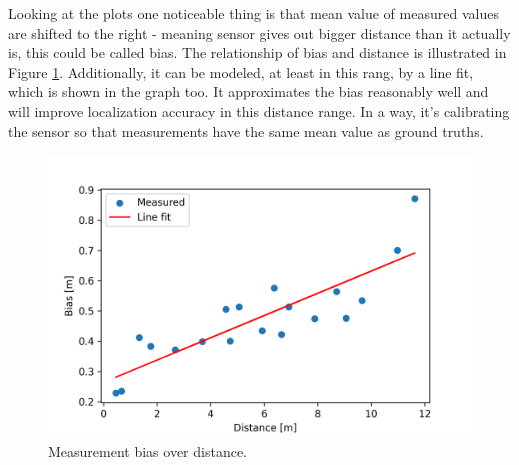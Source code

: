 Looking at the plots one noticeable thing is that mean value of measured values are shifted to the right - meaning sensor gives out bigger distance than it actually is, this could be called bias. The relationship of bias and distance is illustrated in Figure \ref{fig:distance_bias}. Additionally, it can be modeled, at least in this rang,  by a line fit, which is shown in the graph too. It approximates the bias reasonably well and will improve localization accuracy in this distance range. In a way, it's calibrating the sensor so that measurements have the same mean value as ground truths.
\begin{figure}[H]
    \includegraphics[width=\linewidth]{figures/distance_bias.png}
    \caption{Measurement bias over distance.}
    \label{fig:distance_bias}
\end{figure}

